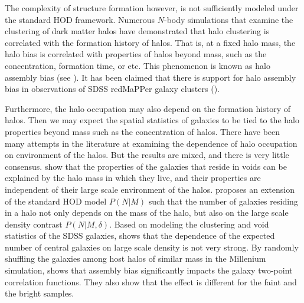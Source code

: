 \documentclass[twocolumn]{aastex61}
\newcommand{\todo}[1]{{\em \textcolor{red}{ #1}}}
\begin{document}
The complexity of structure formation however, is not sufficiently modeled under the standard HOD framework. Numerous $N$-body simulations that examine the clustering of 
dark matter halos have demonstrated that halo clustering is correlated with the formation 
history of halos. That is, at a fixed halo mass, the halo bias is correlated 
with properties of halos beyond mass, such as the concentration, formation time, or etc. 
This phenomenon is known as halo assembly bias (see \citealt{sheth2004,gao2005, harker2006, weschler2006, gao2007,croton2007,wang2007,angulo2008,dalal2008,li2008,sunayama2016}). It has been claimed that there is support for halo assembly bias in observations of SDSS redMaPPer galaxy clusters (\citealt{miyatake2016}).

Furthermore, the halo occupation may also depend on the formation history of halos. Then we may expect the spatial statistics of galaxies to be tied to the halo properties beyond mass such as the concentration of halos. There have been many attempts in the literature at examining the dependence of halo occupation on environment of the halos. But the results are mixed, and there is very little consensus. \citet{tinker_void_2009} show that the properties of the galaxies that reside in voids can be explained by the halo mass in which they live, and their properties are independent of their large scale environment of the halos. \citet{tinker_density_hod} proposes an extension of the standard HOD model $P(N|M)$ such that the number of galaxies residing in a halo not only depends on the mass of the halo, but also on the large scale density contrast $P(N|M,\delta)$. Based on modeling the clustering and void statistics of the SDSS galaxies, \citet{edHOD-tinker} shows that the dependence of the expected number of central galaxies on large scale density is not very strong.    
By randomly shuffling the galaxies among host halos of similar mass in the Millenium simulation, \citet{croton2007} shows that assembly bias significantly impacts the galaxy two-point correlation functions. They also show that the effect is different for the faint and the bright samples.

\end{document}
